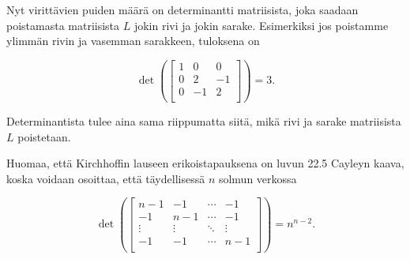 Nyt virittävien puiden määrä on determinantti
matriisista, joka saadaan poistamasta matriisista $L$
jokin rivi ja jokin sarake.
Esimerkiksi jos poistamme ylimmän rivin ja
vasemman sarakkeen, tuloksena on

\[ \det(
\begin{bmatrix}
  1 & 0 & 0 \\
  0 & 2 & -1 \\
  0 & -1 & 2 \\
 \end{bmatrix}
) =3.\]

Determinantista tulee aina sama riippumatta siitä,
mikä rivi ja sarake matriisista $L$ poistetaan.

Huomaa, että Kirchhoffin lauseen erikoistapauksena on
luvun 22.5 Cayleyn kaava, koska voidaan osoittaa, että
täydellisessä $n$ solmun verkossa

\[ \det(
\begin{bmatrix}
  n-1 & -1 & \cdots & -1 \\
  -1 & n-1 & \cdots & -1 \\
  \vdots & \vdots & \ddots & \vdots \\
  -1 & -1 & \cdots & n-1 \\
 \end{bmatrix}
) =n^{n-2}.\]



